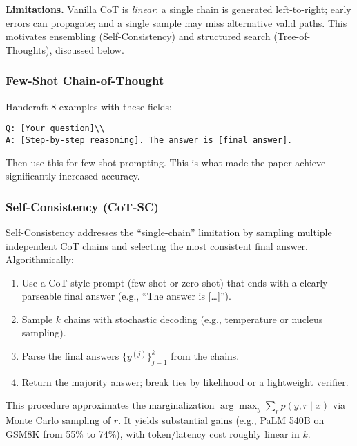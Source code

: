 	\textbf{Limitations.} Vanilla CoT is \emph{linear}: a single chain is generated left-to-right; early errors can propagate; and a single sample may miss alternative valid paths. This motivates ensembling (Self-Consistency) and structured search (Tree-of-Thoughts), discussed below.

\subsubsection{Few-Shot Chain-of-Thought \cite{chainofthought}}
\label{subsec:Few-ShotCoT}
Handcraft 8 examples with these fields:

\begin{lstlisting}[language={},basicstyle=\ttfamily\footnotesize,caption={Few-Shot Chain-of-Thought Prompt Template}]
Q: [Your question]\\
A: [Step-by-step reasoning]. The answer is [final answer].
\end{lstlisting}

Then use this for few-shot prompting. This is what made the paper achieve significantly increased accuracy.

\subsubsection{Self-Consistency (CoT-SC)}
\label{subsec:cot-sc}
Self-Consistency addresses the ``single-chain'' limitation by sampling multiple independent CoT chains and selecting the most consistent final answer. Algorithmically:
\begin{enumerate}
    \item Use a CoT-style prompt (few-shot or zero-shot) that ends with a clearly parseable final answer (e.g., ``The answer is [\dots]'').
    \item Sample $k$ chains with stochastic decoding (e.g., temperature or nucleus sampling).
    \item Parse the final answers $\{y^{(j)}\}_{j=1}^{k}$ from the chains.
    \item Return the majority answer; break ties by likelihood or a lightweight verifier.
\end{enumerate}
This procedure approximates the marginalization $\arg\max_y \sum_r p(y,r\mid x)$ via Monte Carlo sampling of $r$. It yields substantial gains (e.g., PaLM 540B on GSM8K from 55\% to 74\%), with token/latency cost roughly linear in $k$.

